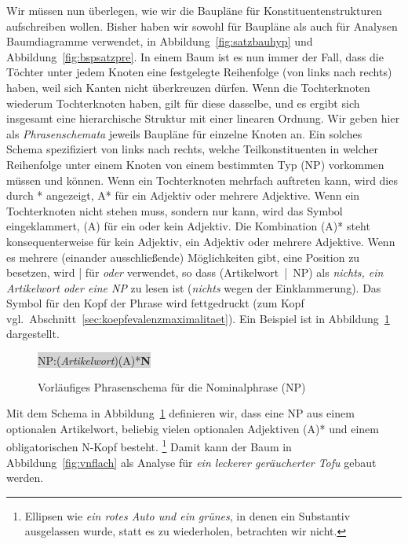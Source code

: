 Wir müssen nun überlegen, wie wir die Baupläne für Konstituentenstrukturen aufschreiben wollen.
Bisher haben wir sowohl für Baupläne als auch für Analysen Baumdiagramme verwendet, \zB in Abbildung~\ref{fig:satzbauhyp} und Abbildung~\ref{fig:bspsatzpre}.
In einem Baum ist es nun immer der Fall, dass die Töchter unter jedem Knoten eine festgelegte Reihenfolge (von links nach rechts) haben, weil sich Kanten nicht überkreuzen dürfen.
Wenn die Tochterknoten wiederum Tochterknoten haben, gilt für diese dasselbe, und es ergibt sich insgesamt eine hierarchische Struktur mit einer linearen Ordnung.
Wir geben hier als \textit{Phrasenschemata} jeweils Baupläne für einzelne Knoten an.
Ein solches Schema spezifiziert von links nach rechts, welche Teilkonstituenten in welcher Reihenfolge unter einem Knoten von einem bestimmten Typ (\zB NP) vorkommen müssen und können.
Wenn ein Tochterknoten mehrfach auftreten kann, wird dies durch * angezeigt, \zB A* für ein Adjektiv oder mehrere Adjektive.
Wenn ein Tochterknoten nicht stehen muss, sondern nur kann, wird das Symbol eingeklammert, \zB (A) für ein oder kein Adjektiv.
Die Kombination (A)* steht konsequenterweise für kein Adjektiv, ein Adjektiv oder mehrere Adjektive.
Wenn es mehrere (einander ausschließende) Möglichkeiten gibt, eine Position zu besetzen, wird | für \textit{oder} verwendet, so dass (Artikelwort~|~NP) als \textit{nichts, ein Artikelwort oder eine NP} zu lesen ist (\textit{nichts} wegen der Einklammerung).
Das Symbol für den Kopf der Phrase wird fettgedruckt (zum Kopf vgl.\ Abschnitt~\ref{sec:koepfevalenzmaximalitaet}).
Ein Beispiel ist in Abbildung~\ref{fig:strschembsp} dargestellt.

\begin{figure}[!htbp]
  \centering
  \colorbox{lightgray}{\strschemspace NP\strschemspace:\strschemspace(\textit{Artikelwort})\strschemspace(A)*\strschemspace\textbf{N}\strschemspace}
  \caption{Vorläufiges Phrasenschema für die Nominalphrase (NP)}
  \label{fig:strschembsp}
\end{figure}

Mit dem Schema in Abbildung~\ref{fig:strschembsp} definieren wir, dass eine NP aus einem optionalen Artikelwort, beliebig vielen optionalen Adjektiven (A)* und einem obligatorischen N-Kopf besteht.%
\footnote{Ellipsen wie \zB \textit{ein rotes Auto und ein grünes}, in denen ein Substantiv ausgelassen wurde, statt es zu wiederholen, betrachten wir nicht.}
Damit kann der Baum in Abbildung~\ref{fig:vnflach} als Analyse für \textit{ein leckerer geräucherter Tofu} gebaut werden.

